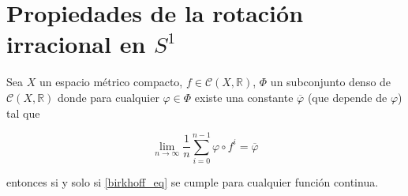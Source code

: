 \chapter{Propiedades de la rotación irracional en $S^1$}

\begin{lema}\label{lema_varphi_m}
	Sea $X$ un espacio métrico compacto, $f \in \mathcal{C}(X,\mathbb{R})$, $\Phi$ un subconjunto denso de $\mathcal{C}(X, \mathbb{R})$ donde para cualquier $\varphi \in \Phi$ existe una constante $\overline{\varphi}$ (que depende de $\varphi$) tal que
	
	\begin{equation}\label{birkhoff_eq}
		\lim_{n \rightarrow \infty} \frac{1}{n} \sum_{i=0}^{n-1} \varphi \circ f^i = \overline{\varphi}
	\end{equation}
	
	entonces si y solo si \eqref{birkhoff_eq} se cumple para cualquier función continua.
\end{lema}

